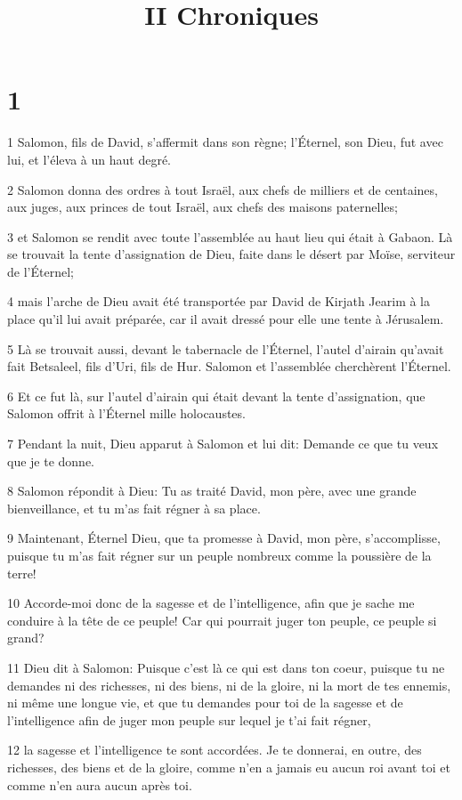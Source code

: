 

\title{II Chroniques}


\chapter{1}

\par 1 Salomon, fils de David, s'affermit dans son règne; l'Éternel, son Dieu, fut avec lui, et l'éleva à un haut degré.
\par 2 Salomon donna des ordres à tout Israël, aux chefs de milliers et de centaines, aux juges, aux princes de tout Israël, aux chefs des maisons paternelles;
\par 3 et Salomon se rendit avec toute l'assemblée au haut lieu qui était à Gabaon. Là se trouvait la tente d'assignation de Dieu, faite dans le désert par Moïse, serviteur de l'Éternel;
\par 4 mais l'arche de Dieu avait été transportée par David de Kirjath Jearim à la place qu'il lui avait préparée, car il avait dressé pour elle une tente à Jérusalem.
\par 5 Là se trouvait aussi, devant le tabernacle de l'Éternel, l'autel d'airain qu'avait fait Betsaleel, fils d'Uri, fils de Hur. Salomon et l'assemblée cherchèrent l'Éternel.
\par 6 Et ce fut là, sur l'autel d'airain qui était devant la tente d'assignation, que Salomon offrit à l'Éternel mille holocaustes.
\par 7 Pendant la nuit, Dieu apparut à Salomon et lui dit: Demande ce que tu veux que je te donne.
\par 8 Salomon répondit à Dieu: Tu as traité David, mon père, avec une grande bienveillance, et tu m'as fait régner à sa place.
\par 9 Maintenant, Éternel Dieu, que ta promesse à David, mon père, s'accomplisse, puisque tu m'as fait régner sur un peuple nombreux comme la poussière de la terre!
\par 10 Accorde-moi donc de la sagesse et de l'intelligence, afin que je sache me conduire à la tête de ce peuple! Car qui pourrait juger ton peuple, ce peuple si grand?
\par 11 Dieu dit à Salomon: Puisque c'est là ce qui est dans ton coeur, puisque tu ne demandes ni des richesses, ni des biens, ni de la gloire, ni la mort de tes ennemis, ni même une longue vie, et que tu demandes pour toi de la sagesse et de l'intelligence afin de juger mon peuple sur lequel je t'ai fait régner,
\par 12 la sagesse et l'intelligence te sont accordées. Je te donnerai, en outre, des richesses, des biens et de la gloire, comme n'en a jamais eu aucun roi avant toi et comme n'en aura aucun après toi.
